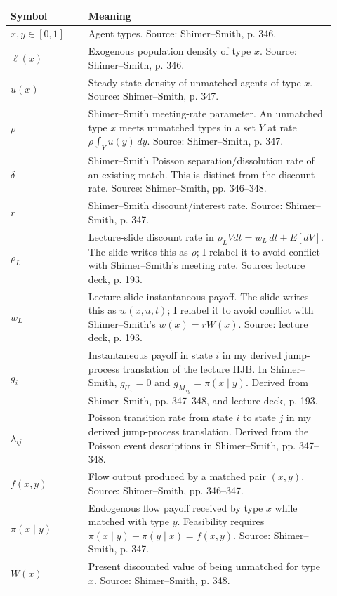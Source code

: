 \documentclass[11pt]{article}
\begin{document}
\begin{center}
\begin{tabular}{>{\raggedright\arraybackslash}p{0.22\linewidth}
                >{\raggedright\arraybackslash}p{0.70\linewidth}}
\toprule
Symbol & Meaning \\
\midrule
$x,y\in[0,1]$ & Agent types. Source: Shimer--Smith, p. 346. \\
$\ell(x)$ & Exogenous population density of type $x$. Source: Shimer--Smith, p. 346. \\
$u(x)$ & Steady-state density of unmatched agents of type $x$. Source: Shimer--Smith, p. 347. \\
$\rho$ & Shimer--Smith meeting-rate parameter. An unmatched type $x$ meets unmatched types in a set $Y$ at rate $\rho\int_Y u(y)\,dy$. Source: Shimer--Smith, p. 347. \\
$\delta$ & Shimer--Smith Poisson separation/dissolution rate of an existing match. This is distinct from the discount rate. Source: Shimer--Smith, pp. 346--348. \\
$r$ & Shimer--Smith discount/interest rate. Source: Shimer--Smith, p. 347. \\
$\rho_L$ & Lecture-slide discount rate in $\rho_L Vdt=w_L\,dt+E[dV]$. The slide writes this as $\rho$; I relabel it to avoid conflict with Shimer--Smith's meeting rate. Source: lecture deck, p. 193. \\
$w_L$ & Lecture-slide instantaneous payoff. The slide writes this as $w(x,u,t)$; I relabel it to avoid conflict with Shimer--Smith's $w(x)=rW(x)$. Source: lecture deck, p. 193. \\
$g_i$ & Instantaneous payoff in state $i$ in my derived jump-process translation of the lecture HJB. In Shimer--Smith, $g_{U_x}=0$ and $g_{M_{xy}}=\pi(x\mid y)$. Derived from Shimer--Smith, pp. 347--348, and lecture deck, p. 193. \\
$\lambda_{ij}$ & Poisson transition rate from state $i$ to state $j$ in my derived jump-process translation. Derived from the Poisson event descriptions in Shimer--Smith, pp. 347--348. \\
$f(x,y)$ & Flow output produced by a matched pair $(x,y)$. Source: Shimer--Smith, pp. 346--347. \\
$\pi(x\mid y)$ & Endogenous flow payoff received by type $x$ while matched with type $y$. Feasibility requires $\pi(x\mid y)+\pi(y\mid x)=f(x,y)$. Source: Shimer--Smith, p. 347. \\
$W(x)$ & Present discounted value of being unmatched for type $x$. Source: Shimer--Smith, p. 348. \\

\end{tabular}
\end{center}
\end{document}
